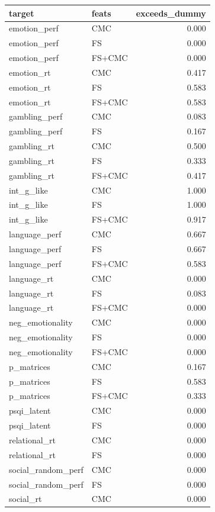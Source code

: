 \documentclass{article}
\begin{document}
\begin{table}
\centering
\begin{tabular}{llr}
	\toprule
	target & feats & exceeds\_dummy \\
	\midrule
	emotion\_perf & CMC & 0.000 \\
	emotion\_perf & FS & 0.000 \\
	emotion\_perf & FS+CMC & 0.000 \\
	emotion\_rt & CMC & 0.417 \\
	emotion\_rt & FS & 0.583 \\
	emotion\_rt & FS+CMC & 0.583 \\
	gambling\_perf & CMC & 0.083 \\
	gambling\_perf & FS & 0.167 \\
	gambling\_rt & CMC & 0.500 \\
	gambling\_rt & FS & 0.333 \\
	gambling\_rt & FS+CMC & 0.417 \\
	int\_g\_like & CMC & 1.000 \\
	int\_g\_like & FS & 1.000 \\
	int\_g\_like & FS+CMC & 0.917 \\
	language\_perf & CMC & 0.667 \\
	language\_perf & FS & 0.667 \\
	language\_perf & FS+CMC & 0.583 \\
	language\_rt & CMC & 0.000 \\
	language\_rt & FS & 0.083 \\
	language\_rt & FS+CMC & 0.000 \\
	neg\_emotionality & CMC & 0.000 \\
	neg\_emotionality & FS & 0.000 \\
	neg\_emotionality & FS+CMC & 0.000 \\
	p\_matrices & CMC & 0.167 \\
	p\_matrices & FS & 0.583 \\
	p\_matrices & FS+CMC & 0.333 \\
	psqi\_latent & CMC & 0.000 \\
	psqi\_latent & FS & 0.000 \\
	relational\_rt & CMC & 0.000 \\
	relational\_rt & FS & 0.000 \\
	social\_random\_perf & CMC & 0.000 \\
	social\_random\_perf & FS & 0.000 \\
	social\_rt & CMC & 0.000 \\

\end{tabular}
\end{table}
\end{document}
